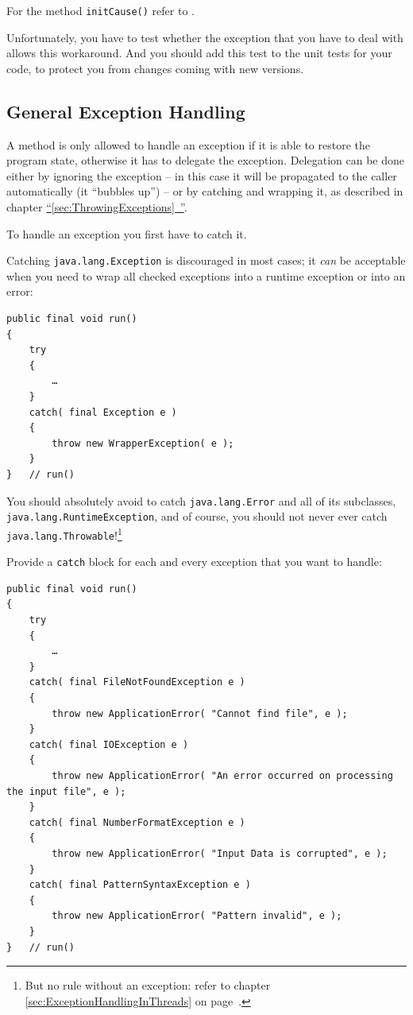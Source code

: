 \documentclass[11pt,a4paper, titlepage, parskip=half, headsepline, footsepline, cleardoublepage=current, headheight=1cm]{scrbook}
\newcommand*{\tqfullref}[1]{\hyperref[{#1}]{“\ref*{#1}~\nameref*{#1}”}}
\newcommand*{\tqvref}[1]{\hyperref[{#1}]{\ref*{#1}} on page~\pageref{#1}}
\begin{document}
For the method \lstinline|initCause()| refer to \autocite{ORACLE_DOC_THROWABLE:initCause}.

Unfortunately, you have to test whether the exception that you have to deal with allows this workaround. And you should add this test to the unit tests for your code, to protect you from changes coming with new versions.


\subsection{General Exception Handling}\label{sec:GeneralExceptionHandling}
A method is only allowed to handle an exception if it is able to restore the program state, otherwise it has to delegate the exception. Delegation can be done either by ignoring the exception – in this case it will be propagated to the caller automatically (it “bubbles up”) – or by catching and wrapping it, as described in chapter \tqfullref{sec:ThrowingExceptions}.

To handle an exception you first have to catch it.

Catching \lstinline|java.lang.Exception| is discouraged in most cases; it \textit{can} be acceptable when you need to wrap all checked exceptions into a runtime exception or into an error:
\begin{lstlisting}
public final void run()
{
    try
    {
        …
    }
    catch( final Exception e )
    {
        throw new WrapperException( e );
    }
}   // run()
\end{lstlisting}

You should absolutely avoid to catch \lstinline|java.lang.Error| and all of its subclasses, \lstinline|java.lang.RuntimeException|, and of course, you should not never ever catch \lstinline|java.lang.Throwable|!\footnote{But no rule without an exception: refer to chapter \tqvref{sec:ExceptionHandlingInThreads}.}

Provide a \lstinline|catch| block for each and every exception that you want to handle:
\begin{lstlisting}
public final void run()
{
    try
    {
        …
    }
    catch( final FileNotFoundException e )
    {
        throw new ApplicationError( "Cannot find file", e );
    }
    catch( final IOException e )
    {
        throw new ApplicationError( "An error occurred on processing the input file", e );
    }
    catch( final NumberFormatException e )
    {
        throw new ApplicationError( "Input Data is corrupted", e );
    }
    catch( final PatternSyntaxException e )
    {
        throw new ApplicationError( "Pattern invalid", e );
    }
}   // run()
\end{lstlisting}
\end{document}
